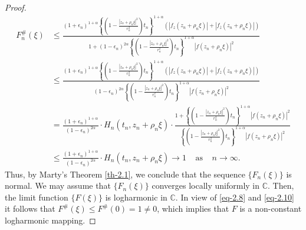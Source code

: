 \documentclass[10pt,a4paper]{amsart}
\begin{document}
\begin{proof}
\begin{align}
	F^{\#}_n(\xi)\nonumber&\leq \frac{(1+\epsilon_n)^{1+\alpha} \left\{\left(1- \frac{|z_n+ \rho_n\xi|^2} {r^2_n}\right)t_n \right\}^{1+\alpha} \left(|f_z(z_n+\rho_n\xi)| + |f_{\overline{z}} (z_n+\rho_n\xi)| \right)}{1+(1-\epsilon_n) ^{2\alpha} \left\{\left(1- \frac{|z_n+ \rho_n\xi|^2}{r^2_n}\right) t_n\right\}^{1+\alpha} |f(z_n+ \rho_n\xi)|^2} \\&\nonumber\leq \frac{(1+\epsilon_n)^{1+\alpha}\left\{\left(1- \frac{|z_n+ \rho_n\xi|^2} {r^2_n}\right)t_n\right\}^{1+\alpha} \left(|f_z(z_n +\rho_n\xi)| + |f_{\overline{z}}(z_n+\rho_n\xi)| \right)}{(1- \epsilon_n)^{2\alpha} \left\{\left(1- \frac{|z_n+ \rho_n\xi|^2} {r^2_n}\right)t_n\right\}^{1+\alpha} |f(z_n+ \rho_n\xi)|^2} \\&\nonumber=\frac{(1+\epsilon_n)^{1+\alpha}}{(1-\epsilon_n)^{2\alpha}} \cdot H_n(t_n, z_n+\rho_n\xi) \cdot \frac{1+ \left\{\left(1- \frac{|z_n+ \rho_n\xi|^2}{r^2_n}\right)t_n\right\}^{1+\alpha} |f(z_n+ \rho_n\xi)|^2}{\left\{\left(1- \frac{|z_n+ \rho_n\xi|^2} {r^2_n}\right)t_n\right\}^{1+\alpha} |f(z_n+ \rho_n\xi)|^2} \\&\leq\frac{(1+\epsilon_n)^{1+\alpha}} {(1-\epsilon_n)^{2\alpha}} \cdot H_n(t_n, z_n+\rho_n\xi) \rightarrow 1 \;\;\;\;\mbox{as} \;\;\;\;n\rightarrow \infty.
\end{align}
Thus, by Marty's Theorem \ref{th-2.1}, we conclude that the sequence $\{F_n(\xi)\}$ is normal. We may assume that $\{F_n(\xi)\}$ converges locally uniformly in $\mathbb{C}$. Then, the limit function $\{F(\xi)\}$ is logharmonic in $\mathbb{C}$. In view of \eqref{eq-2.8}
and \eqref{eq-2.10} it follows that $F^{\#}(\xi)\leq F^{\#}(0)= 1\neq 0$, which implies that $F$ is a non-constant logharmonic mapping. \vspace{2mm}


\end{proof}
\end{document}

